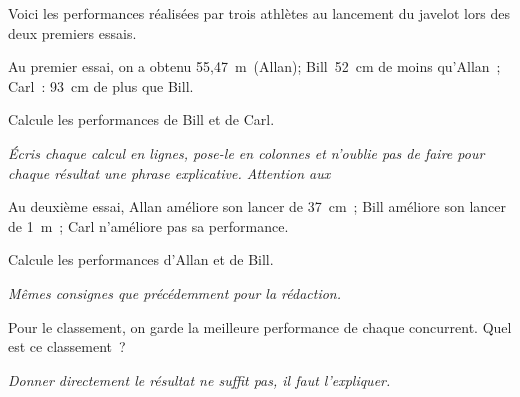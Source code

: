 Voici les performances réalisées par trois athlètes au lancement du javelot lors des deux premiers essais.
\begin{myenumerate}
  \item Au premier essai, on a obtenu 55,47~m (Allan); Bill 52~cm de moins qu'Allan ; Carl : 93~cm de plus que Bill.
  \par Calcule les performances de Bill et de Carl.
\par{\em \'Ecris chaque calcul en lignes, pose-le en colonnes et n'oublie pas de faire pour chaque résultat une phrase explicative. Attention aux \dotfill}
\item Au deuxième essai, Allan améliore son lancer de 37~cm ; Bill améliore son lancer de 1~m ; Carl n'améliore pas sa performance.
\par Calcule les performances d'Allan et de Bill.
\par{\em Mêmes consignes que précédemment pour la rédaction.}
\item Pour le classement, on garde la meilleure performance de chaque concurrent. Quel est ce classement ?
\par{\em Donner directement le résultat ne suffit pas, il faut l'expliquer.}
\end{myenumerate}